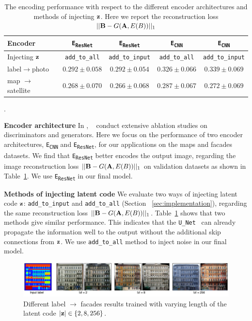 \begin{table}
\begin{center}
 \begin{tabular}{l c c c c}
	Encoder & \texttt{E\textsubscript{ResNet}}  &  \texttt{E\textsubscript{ResNet}} &  \texttt{E\textsubscript{CNN}}  &  \texttt{E\textsubscript{CNN}} \\ \hline
	Injecting $\mathbf{z}$ & \texttt{add\_to\_all} &  \texttt{add\_to\_input} & \texttt{add\_to\_all} &  \texttt{add\_to\_input}\\ \hline
	label$\rightarrow$photo & $0.292 \pm 0.058$ & $0.292 \pm0.054$ & $0.326\pm 0.066$& $0.339\pm 0.069$ \\
	map $\rightarrow$ satellite &  $0.268 \pm 0.070$  & $0.266 \pm 0.068$ & $0.287 \pm 0.067$&$0.272\pm 0.069$\\
    \hline
	\end{tabular}
		\caption{The encoding performance with respect to the different encoder architectures and methods of injecting $\mathbf{z}$. Here we report the reconstruction loss $||\mathbf{B} - G(\mathbf{A},E(B)) ||_1$}.
			\label{tab:rec}
	\end{center}
\vspace{-10mm}
\end{table}

{\bf Encoder architecture} In \pp, ~\citet{isola2016image} conduct extensive ablation studies on discriminators and generators. Here we focus on the performance of two encoder architectures, \texttt{E\textsubscript{CNN}} and \texttt{E\textsubscript{ResNet}}, for our applications on the maps and facades datasets. We find that \texttt{E\textsubscript{ResNet}} better encodes the output image, regarding the image reconstruction loss $||\mathbf{B} - G(\mathbf{A},E(B)) ||_1$ on validation datasets as shown in Table~\ref{tab:rec}. We use \texttt{E\textsubscript{ResNet}} in our final model.

{\bf Methods of injecting latent code} We evaluate two ways of injecting latent code $\mathbf{z}$: \texttt{add\_to\_input} and \texttt{add\_to\_all} (Section ~\ref{sec:implementation}), regarding the same reconstruction loss $||\mathbf{B} - G(\mathbf{A},E(B)) ||_1$. Table~\ref{tab:rec} shows that two methods give similar performance. This indicates that the \texttt{U\_Net}~\cite{ronneberger2015u} can already propagate the information well to the output without the additional skip connections from $\mathbf{z}$. We use \texttt{add\_to\_all} method to inject noise in our final model.

\begin{figure}
  \centering
  \includegraphics[width=1.\linewidth]{imgs/nz_facades.pdf}
\vspace{-4mm}
\caption{Different label $\rightarrow$ facades results trained with varying length of the latent code $|\mathbf{z}| \in \{2, 8, 256\}$. }
\label{fig:numberofz}
\vspace{-6mm}
\end{figure}


